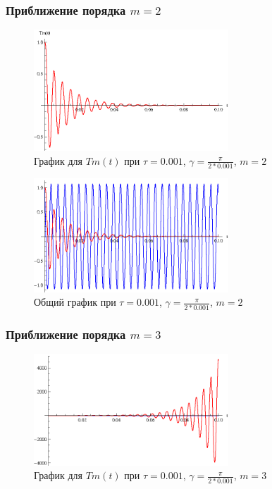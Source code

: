 \newpage

\subsubsection{Приближение порядка $m=2$}

\begin{figure}[h]
\begin{center}
\includegraphics[width=0.65\textwidth]{./3_results/5_4.eps}
\end{center}
\caption{График для $Tm(t)$ при $\tau=0.001$, $\gamma = \frac{\pi}{2*0.001}$, $m=2$}
\end{figure}

\begin{figure}[h]
\begin{center}
\includegraphics[width=0.65\textwidth]{./3_results/5_5.eps}
\end{center}
\caption{Общий график при $\tau=0.001$, $\gamma = \frac{\pi}{2*0.001}$, $m=2$}
\end{figure}

\newpage

\subsubsection{Приближение порядка $m=3$}

\begin{figure}[h]
\begin{center}
\includegraphics[width=0.65\textwidth]{./3_results/5_6.eps}
\end{center}
\caption{График для $Tm(t)$ при $\tau=0.001$, $\gamma = \frac{\pi}{2*0.001}$, $m=3$}
\end{figure}

